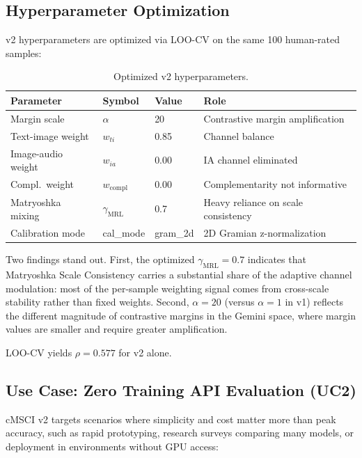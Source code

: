 \documentclass[a4paper,fleqn]{cas-sc}
\begin{document}
\begin{itemize}
\subsection{Hyperparameter Optimization}\label{sec:v2-hyperparams}

v2 hyperparameters are optimized via LOO-CV on the same 100 human-rated samples:

\begin{table}[t]
\caption{Optimized v2 hyperparameters.}\label{tab:v2-hyperparams}
\centering
\begin{tabular}{llll}
\toprule
Parameter & Symbol & Value & Role \\
\midrule
Margin scale & $\alpha$ & 20 & Contrastive margin amplification \\
Text-image weight & $w_{ti}$ & 0.85 & Channel balance \\
Image-audio weight & $w_{ia}$ & 0.00 & IA channel eliminated \\
Compl.\ weight & $w_{\mathrm{compl}}$ & 0.00 & Complementarity not informative \\
Matryoshka mixing & $\gamma_{\mathrm{MRL}}$ & 0.7 & Heavy reliance on scale consistency \\
Calibration mode & cal\_mode & gram\_2d & 2D Gramian z-normalization \\
\bottomrule
\end{tabular}
\end{table}

Two findings stand out. First, the optimized $\gamma_{\mathrm{MRL}} = 0.7$ indicates that Matryoshka Scale Consistency carries a substantial share of the adaptive channel modulation: most of the per-sample weighting signal comes from cross-scale stability rather than fixed weights. Second, $\alpha = 20$ (versus $\alpha = 1$ in v1) reflects the different magnitude of contrastive margins in the Gemini space, where margin values are smaller and require greater amplification.

LOO-CV yields $\rho = 0.577$ for v2 alone.

\subsection{Use Case: Zero Training API Evaluation (UC2)}\label{sec:uc2}

cMSCI v2 targets scenarios where simplicity and cost matter more than peak accuracy, such as rapid prototyping, research surveys comparing many models, or deployment in environments without GPU access:


\end{itemize}
\end{document}
